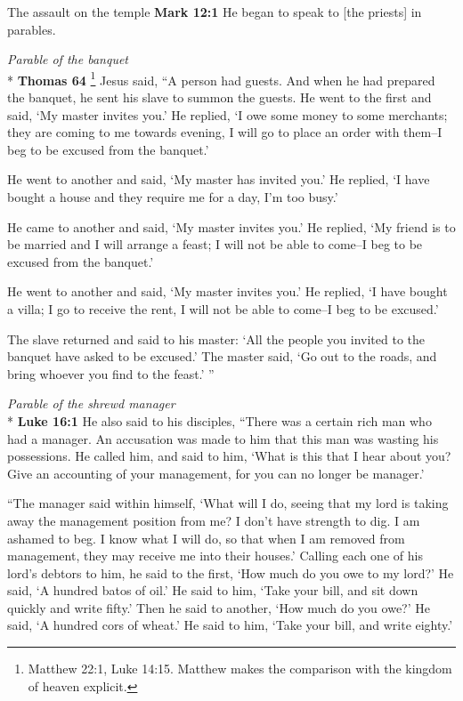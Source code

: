 \documentclass[10pt,twoside]{article} %
\newcommand{\quotesize}{\normalsize{}}
\newenvironment{quotetext}{\begingroup\quotesize}{\endgroup}
\newcommand{\intex}[1]{\index[texts]{#1}}
\newcommand{\bible}[2]{\begin{quotetext}\textbf{#1}\intex{#1} #2\end{quotetext}}
\newcommand{\gospelmark}[2]{\bible{Mark #1}{#2}}
\newcommand{\luke}[2]{\bible{Luke #1}{#2}}
\newcommand{\thomas}[2]{\bible{Thomas #1}{#2}}
\newcommand{\subhead}[1]{\emph{#1}\\*}
\begin{document}
\begin{section}{The assault on the temple}
\gospelmark{12:1}{
   He began to speak to [the priests] in parables.}

\subhead{Parable of the banquet}
\thomas{64}{\footnote{Matthew 22:1, Luke 14:15. Matthew makes the comparison with the kingdom of heaven explicit.}
Jesus said, ``A person had guests. And when he had prepared the banquet, he sent his
slave to summon the guests. He went to the first and said, `My
master invites you.' He replied, `I owe some money to some merchants;
they are coming to me towards evening, I will go to place an order
with them--I beg to be excused from the banquet.'

He went to another and said,
`My master has invited you.' He replied, `I
have bought a house and they require me for a day, I'm too busy.'

He came to another and said, `My master
invites you.' He replied, `My friend is to be married and I
will arrange a feast; I will not be able to come--I beg to be
excused from the banquet.'

He went to another and said, `My
master invites you.' He replied, `I have bought a villa; I go
to receive the rent, I will not be able to come--I beg to be
excused.'

The slave returned and said to his master: `All the people you
invited to the banquet have asked to be excused.' The master said,
`Go out to the roads, and bring whoever you find
to the feast.' ''
}


\subhead{Parable of the shrewd manager}
\luke{16:1}{
He also said to his disciples, ``There was a certain rich man who had a manager. An accusation was made to him that this man was wasting his possessions.  
  He called him, and said to him, `What is this that I hear about you? Give an accounting of your management, for you can no longer be manager.'

   ``The manager said within himself, `What will I do, seeing that my lord is taking away the management position from me? I don't have strength to dig. I am ashamed to beg.    I know what I will do, so that when I am removed from management, they may receive me into their houses.'    Calling each one of his lord's debtors to him, he said to the first, `How much do you owe to my lord?'    He said, `A hundred batos of oil.' He said to him, `Take your bill, and sit down quickly and write fifty.'    Then he said to another, `How much do you owe?' He said, `A hundred cors of wheat.' He said to him, `Take your bill, and write eighty.'

}
\end{section}
\end{document}
